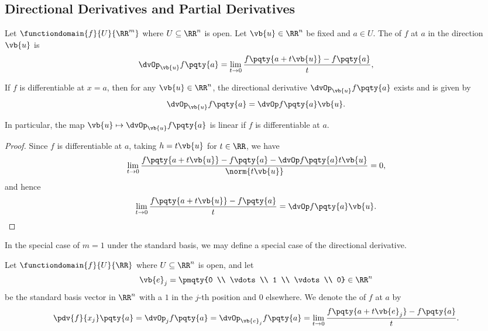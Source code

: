 \subsection{Directional Derivatives and Partial Derivatives}

\begin{definition}
    Let \(\functiondomain{f}{U}{\RR^m}\) where \(U \subseteq \RR^n\) is open. Let \(\vb{u} \in \RR^n\) be fixed and \(a \in U\). The  of \(f\) at \(a\) in the direction \(\vb{u}\) is
    \[
        \dvOp_{\vb{u}} f\pqty{a} = \lim_{t \to 0} \frac{f\pqty{a + t\vb{u}} - f\pqty{a}}{t},
    \]
\end{definition}

\begin{proposition}
    If \(f\) is differentiable at \(x = a\), then for any \(\vb{u} \in \RR^n\), the directional derivative \(\dvOp_{\vb{u}} f\pqty{a}\) exists and is given by
    \[
        \dvOp_{\vb{u}} f\pqty{a} = \dvOp f\pqty{a}\vb{u}.
    \]

    In particular, the map \(\vb{u} \mapsto \dvOp_{\vb{u}} f\pqty{a}\) is linear if \(f\) is differentiable at \(a\).
\end{proposition}

\begin{proof}
    Since \(f\) is differentiable at \(a\), taking \(h = t\vb{u}\) for \(t \in \RR\), we have
    \[
        \lim_{t \to 0} \frac{f\pqty{a + t\vb{u}} - f\pqty{a} - \dvOp f\pqty{a} t\vb{u}}{\norm{t\vb{u}}} = 0,
    \]
    and hence
    \[
        \lim_{t \to 0} \frac{f\pqty{a + t\vb{u}} - f\pqty{a}}{t} = \dvOp f\pqty{a}\vb{u}.
    \]
\end{proof}

In the special case of \(m = 1\) under the standard basis, we may define a special case of the directional derivative.

\begin{definition}
    Let \(\functiondomain{f}{U}{\RR}\) where \(U \subseteq \RR^n\) is open, and let
    \[
        \vb{e}_j = \pmqty{0 \\ \vdots \\ 1 \\ \vdots \\ 0} \in \RR^n
    \]
    be the standard basis vector in \(\RR^n\) with a \(1\) in the \(j\)-th position and \(0\) elsewhere. We denote the  of \(f\) at \(a\) by
    \[
        \pdv{f}{x_j}\pqty{a} = \dvOp_j f\pqty{a} = \dvOp_{\vb{e}_j} f\pqty{a} = \lim_{t \to 0} \frac{f\pqty{a + t\vb{e}_j} - f\pqty{a}}{t}.
    \]
\end{definition}

